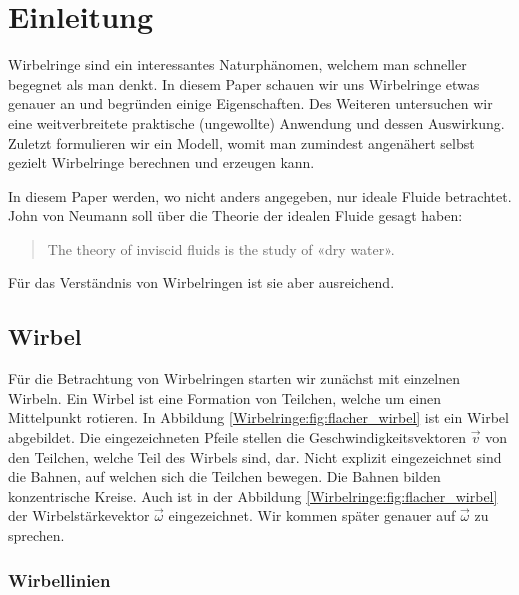 %
%
%
\section{Einleitung}

Wirbelringe sind ein interessantes Naturphänomen, welchem man schneller begegnet als man denkt. 
In diesem Paper schauen wir uns Wirbelringe etwas genauer an und begründen einige Eigenschaften. 
Des Weiteren untersuchen wir eine weitverbreitete praktische (ungewollte) Anwendung und dessen Auswirkung. 
Zuletzt formulieren wir ein Modell, womit man zumindest angenähert selbst gezielt Wirbelringe berechnen und erzeugen kann.

In diesem Paper werden, wo nicht anders angegeben, nur ideale Fluide betrachtet.
John von Neumann soll über die Theorie der idealen Fluide gesagt haben\cite{Wirbelringe:feynman1964lectures}: 

\begin{quote}
    The theory of inviscid fluids is the study of «dry water».
\end{quote}

Für das Verständnis von Wirbelringen ist sie aber ausreichend.

\subsection{Wirbel}



Für die Betrachtung von Wirbelringen starten wir zunächst mit einzelnen Wirbeln.
Ein Wirbel ist eine Formation von Teilchen, welche um einen Mittelpunkt rotieren.
In Abbildung \ref{Wirbelringe:fig:flacher_wirbel} ist ein Wirbel abgebildet.
Die eingezeichneten Pfeile stellen die Geschwindigkeitsvektoren \( \vec{v} \) von den Teilchen, welche Teil des Wirbels sind, dar.
Nicht explizit eingezeichnet sind die Bahnen, auf welchen sich die Teilchen bewegen.
Die Bahnen bilden konzentrische Kreise.
Auch ist in der Abbildung \ref{Wirbelringe:fig:flacher_wirbel} der Wirbelstärkevektor \(\vec{\omega}\) eingezeichnet.
Wir kommen später genauer auf \(\vec{\omega}\) zu sprechen.

\subsubsection*{Wirbellinien \label{Wirbelringe:Wirbellinien}}

